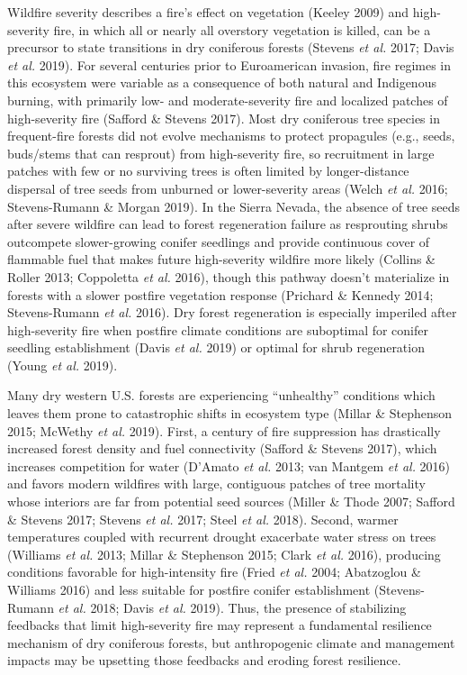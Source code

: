 \documentclass[]{article}
\begin{document}
Wildfire severity describes a fire's effect on vegetation (Keeley 2009)
and high-severity fire, in which all or nearly all overstory vegetation
is killed, can be a precursor to state transitions in dry coniferous
forests (Stevens \emph{et al.} 2017; Davis \emph{et al.} 2019). For
several centuries prior to Euroamerican invasion, fire regimes in this
ecosystem were variable as a consequence of both natural and Indigenous
burning, with primarily low- and moderate-severity fire and localized
patches of high-severity fire (Safford \& Stevens 2017). Most dry
coniferous tree species in frequent-fire forests did not evolve
mechanisms to protect propagules (e.g., seeds, buds/stems that can
resprout) from high-severity fire, so recruitment in large patches with
few or no surviving trees is often limited by longer-distance dispersal
of tree seeds from unburned or lower-severity areas (Welch \emph{et al.}
2016; Stevens-Rumann \& Morgan 2019). In the Sierra Nevada, the absence
of tree seeds after severe wildfire can lead to forest regeneration
failure as resprouting shrubs outcompete slower-growing conifer
seedlings and provide continuous cover of flammable fuel that makes
future high-severity wildfire more likely (Collins \& Roller 2013;
Coppoletta \emph{et al.} 2016), though this pathway doesn't materialize
in forests with a slower postfire vegetation response (Prichard \&
Kennedy 2014; Stevens-Rumann \emph{et al.} 2016). Dry forest
regeneration is especially imperiled after high-severity fire when
postfire climate conditions are suboptimal for conifer seedling
establishment (Davis \emph{et al.} 2019) or optimal for shrub
regeneration (Young \emph{et al.} 2019).

Many dry western U.S. forests are experiencing ``unhealthy'' conditions
which leaves them prone to catastrophic shifts in ecosystem type (Millar
\& Stephenson 2015; McWethy \emph{et al.} 2019). First, a century of
fire suppression has drastically increased forest density and fuel
connectivity (Safford \& Stevens 2017), which increases competition for
water (D'Amato \emph{et al.} 2013; van Mantgem \emph{et al.} 2016) and
favors modern wildfires with large, contiguous patches of tree mortality
whose interiors are far from potential seed sources (Miller \& Thode
2007; Safford \& Stevens 2017; Stevens \emph{et al.} 2017; Steel
\emph{et al.} 2018). Second, warmer temperatures coupled with recurrent
drought exacerbate water stress on trees (Williams \emph{et al.} 2013;
Millar \& Stephenson 2015; Clark \emph{et al.} 2016), producing
conditions favorable for high-intensity fire (Fried \emph{et al.} 2004;
Abatzoglou \& Williams 2016) and less suitable for postfire conifer
establishment (Stevens-Rumann \emph{et al.} 2018; Davis \emph{et al.}
2019). Thus, the presence of stabilizing feedbacks that limit
high-severity fire may represent a fundamental resilience mechanism of
dry coniferous forests, but anthropogenic climate and management impacts
may be upsetting those feedbacks and eroding forest resilience.
\end{document}

